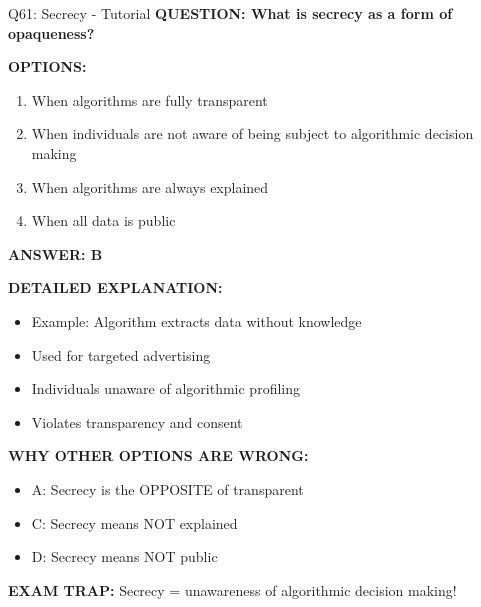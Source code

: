 \documentclass[8pt]{beamer}
\begin{document}
	\begin{frame}{Q61: Secrecy - Tutorial}
		\fontsize{6.5}{7.5}\selectfont
		\textbf{QUESTION: What is secrecy as a form of opaqueness?}
		
		\vspace{0.1cm}
		\textbf{OPTIONS:}
		\begin{enumerate}
			\item When algorithms are fully transparent
			\item When individuals are not aware of being subject to algorithmic decision making
			\item When algorithms are always explained
			\item When all data is public
		\end{enumerate}
		
		\vspace{0.1cm}
		\textcolor{myblue}{\textbf{ANSWER: B}}
		
		\vspace{0.1cm}
		\textbf{DETAILED EXPLANATION:}
		\begin{itemize}
			\item Example: Algorithm extracts data without knowledge
			\item Used for targeted advertising
			\item Individuals unaware of algorithmic profiling
			\item Violates transparency and consent
		\end{itemize}
		
		\vspace{0.1cm}
		\textcolor{myred}{\textbf{WHY OTHER OPTIONS ARE WRONG:}}
		\begin{itemize}
			\item \textcolor{myred}{A:} Secrecy is the OPPOSITE of transparent
			\item \textcolor{myred}{C:} Secrecy means NOT explained
			\item \textcolor{myred}{D:} Secrecy means NOT public
		\end{itemize}
		
		\textcolor{myred}{\textbf{EXAM TRAP:}} Secrecy = \textcolor{myblue}{unawareness of algorithmic decision making}!
	\end{frame}
	
\end{document}
